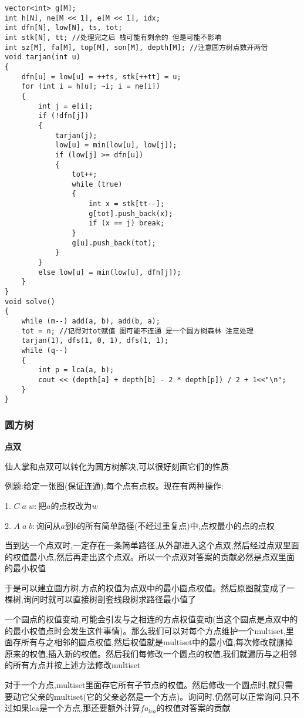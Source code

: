 \documentclass[a4paper,fontset=none]{ctexart}
\begin{document}
\begin{verbatim}
vector<int> g[M];
int h[N], ne[M << 1], e[M << 1], idx;
int dfn[N], low[N], ts, tot;
int stk[N], tt; //处理完之后 栈可能有剩余的 但是可能不影响
int sz[M], fa[M], top[M], son[M], depth[M]; //注意圆方树点数开两倍
void tarjan(int u)
{
    dfn[u] = low[u] = ++ts, stk[++tt] = u;
    for (int i = h[u]; ~i; i = ne[i])
    {
        int j = e[i];
        if (!dfn[j])
        {
            tarjan(j);
            low[u] = min(low[u], low[j]);
            if (low[j] >= dfn[u])
            {
                tot++;
                while (true)
                {
                    int x = stk[tt--];
                    g[tot].push_back(x);
                    if (x == j) break;
                }
                g[u].push_back(tot);
            }
        }
        else low[u] = min(low[u], dfn[j]);
    }
}
void solve()
{
    while (m--) add(a, b), add(b, a);
    tot = n; //记得对tot赋值 图可能不连通 是一个圆方树森林 注意处理
    tarjan(1), dfs(1, 0, 1), dfs(1, 1);
    while (q--)
    {
        int p = lca(a, b);
        cout << (depth[a] + depth[b] - 2 * depth[p]) / 2 + 1<<"\n";
    }
}
\end{verbatim}
\subsubsection{圆方树}

\textbf{点双}

仙人掌和点双可以转化为圆方树解决,可以很好刻画它们的性质

例题:给定一张图(保证连通),每个点有点权。现在有两种操作:

1. $C\;a\;w:$把$a$的点权改为$w$

2. $A\;a\;b:$询问从$a$到$b$的所有简单路径(不经过重复点)中,点权最小的点的点权

当到达一个点双时,一定存在一条简单路径,从外部进入这个点双,然后经过点双里面的权值最小点,然后再走出这个点双。所以一个点双对答案的贡献必然是点双里面的最小权值

于是可以建立圆方树,方点的权值为点双中的最小圆点权值。然后原图就变成了一棵树,询问时就可以直接树剖套线段树求路径最小值了

一个圆点的权值变动,可能会引发与之相连的方点权值变动(当这个圆点是点双中的的最小权值点时会发生这件事情)。那么我们可以对每个方点维护一个multiset,里面存所有与之相邻的圆点权值,然后权值就是multiset中的最小值,每次修改就删掉原来的权值,插入新的权值。然后我们每修改一个圆点的权值,我们就遍历与之相邻的所有方点并按上述方法修改multiset

对于一个方点,multiset里面存它所有子节点的权值。然后修改一个圆点时,就只需要动它父亲的multiset(它的父亲必然是一个方点)。询问时,仍然可以正常询问,只不过如果lca是一个方点,那还要额外计算$fa_{lca}$的权值对答案的贡献
\end{document}
